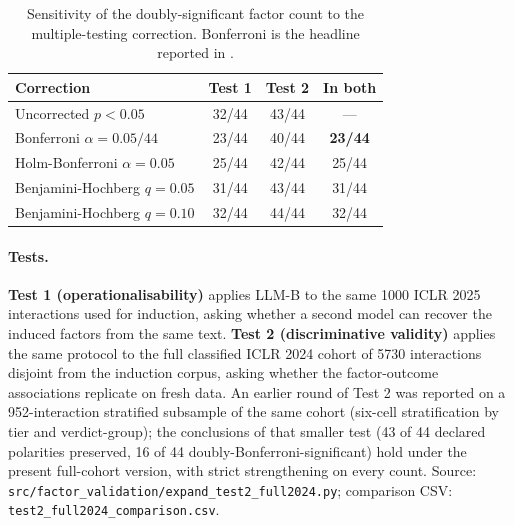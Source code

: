 \documentclass{article}
\newcommand{\code}[1]{\texttt{#1}}
\begin{document}
\begin{table}[htbp]
    \centering
    \caption{Sensitivity of the doubly-significant factor count to the multiple-testing correction. Bonferroni is the headline reported in .}
    \label{tab:mtcorrection}
    \begin{tabular}{lccc}
    \toprule
    Correction & Test 1 & Test 2 & In both \\
    \midrule
    Uncorrected $p < 0.05$              & 32/44 & 43/44 & --- \\
    Bonferroni $\alpha = 0.05 / 44$    & 23/44 & 40/44 & \textbf{23/44} \\
    Holm-Bonferroni $\alpha = 0.05$    & 25/44 & 42/44 & 25/44 \\
    Benjamini-Hochberg $q = 0.05$      & 31/44 & 43/44 & 31/44 \\
    Benjamini-Hochberg $q = 0.10$      & 32/44 & 44/44 & 32/44 \\
    \bottomrule
    \end{tabular}
\end{table}

\paragraph{Tests.}
\textbf{Test 1 (operationalisability)} applies LLM-B to the same \num{1000} ICLR 2025 interactions used for induction, asking whether a second model can recover the induced factors from the same text. \textbf{Test 2 (discriminative validity)} applies the same protocol to the full classified ICLR 2024 cohort of \num{5730} interactions disjoint from the induction corpus, asking whether the factor-outcome associations replicate on fresh data. An earlier round of Test 2 was reported on a \num{952}-interaction stratified subsample of the same cohort (six-cell stratification by tier and verdict-group); the conclusions of that smaller test (43 of 44 declared polarities preserved, 16 of 44 doubly-Bonferroni-significant) hold under the present full-cohort version, with strict strengthening on every count. Source: \code{src/factor\_validation/expand\_test2\_full2024.py}; comparison CSV: \code{test2\_full2024\_comparison.csv}.
\end{document}

